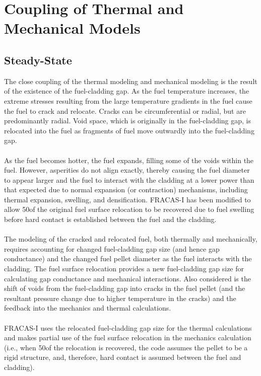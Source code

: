 \section{Coupling of Thermal and Mechanical Models}\label{section:coupling-of-thermal-mechanical-models}
\subsection{Steady-State}\label{steady-state-1}
The close coupling of the thermal modeling and mechanical modeling is the result of the existence of
the fuel-cladding gap. As the fuel temperature increases, the extreme stresses resulting from the
large temperature gradients in the fuel cause the fuel to crack and relocate. Cracks can be
circumferential or radial, but are predominantly radial. Void space, which is originally in the
fuel-cladding gap, is relocated into the fuel as fragments of fuel move outwardly into the
fuel-cladding gap.
\\
\\
As the fuel becomes hotter, the fuel expands, filling some of the voids within the fuel. However,
asperities do not align exactly, thereby causing the fuel diameter to appear larger and the fuel to
interact with the cladding at a lower power than that expected due to normal expansion (or
contraction) mechanisms, including thermal expansion, swelling, and densification. FRACAS-I has been
modified to allow 50\percent of the original fuel surface relocation to be recovered due to fuel
swelling before hard contact is established between the fuel and the cladding.
\\
\\
The modeling of the cracked and relocated fuel, both thermally and mechanically, requires accounting
for changed fuel-cladding gap size (and hence gap conductance) and the changed fuel pellet diameter
as the fuel interacts with the cladding. The fuel surface relocation provides a new fuel-cladding
gap size for calculating gap conductance and mechanical interactions. Also considered is the shift
of voids from the fuel-cladding gap into cracks in the fuel pellet (and the resultant pressure
change due to higher temperature in the cracks) and the feedback into the mechanics and thermal
calculations.
\\
\\
FRACAS-I uses the relocated fuel-cladding gap size for the thermal calculations and makes partial
use of the fuel surface relocation in the mechanics calculation (i.e., when 50\percent of the
relocation is recovered, the code assumes the pellet to be a rigid structure, and, therefore, hard
contact is assumed between the fuel and cladding).
